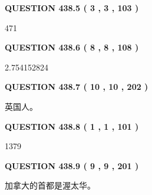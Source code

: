 \documentclass{ctexart}
\begin{document}
 
  
\vspace{0.2in}
  
{\textbf{\Large{QUESTION
438.5 
 ( 3 , 3 , 103 )
}}}
  
  
 
 
\noindent{}

471
 
 
  
\vspace{0.2in}
  
{\textbf{\Large{QUESTION
438.6 
 ( 8 , 8 , 108 )
}}}
  
  
 
 
\noindent{}

2.754152824
 
 
  
\vspace{0.2in}
  
{\textbf{\Large{QUESTION
438.7 
 ( 10 , 10 , 202 )
}}}
  
  
 
 
\noindent{}
 
 
英国人。
 
 
 
 
  
\vspace{0.2in}
  
{\textbf{\Large{QUESTION
438.8 
 ( 1 , 1 , 101 )
}}}
  
  
 
 
\noindent{}

1379
 
 
  
\vspace{0.2in}
  
{\textbf{\Large{QUESTION
438.9 
 ( 9 , 9 , 201 )
}}}
  
  
 
 
\noindent{}
 
 
加拿大的首都是渥太华。
 
 
 
 
  
\vspace{0.2in}
  
\end{document}
